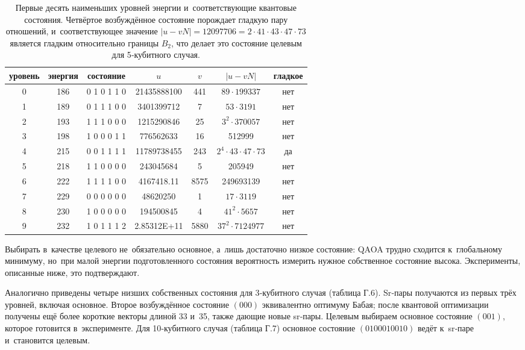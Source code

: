 \begin{table}[h]
    \centering
    \caption{
    Первые десять наименьших уровней энергии и соответствующие квантовые
    состояния. Четвёртое возбуждённое состояние порождает гладкую пару
    отношений, и соответствующее значение \( |u-vN| = 12097706 =
    2\cdot41\cdot43\cdot47\cdot73 \) является гладким относительно границы
    \(B_{2}\), что делает это состояние целевым для 5‑кубитного случая.
    }
\begin{tabular}{@{}ccccccc@{}}
\hline\hline
\textbf{уровень} & \textbf{энергия} & \textbf{состояние} &
\(u\) & \(v\) & \(|u-vN|\) & гладкое \\ \hline
0 & 186 & 0 1 0 1 1 0 & 21435888100 &   441 & $89{\cdot}199337$ & нет \\
1 & 189 & 0 1 1 1 0 0 &  3401399712 &    7 & $53{\cdot}3191$   & нет \\
2 & 193 & 1 1 1 0 0 0 & 1215290846 &   25 & $3^{2}{\cdot}370057$ & нет \\
3 & 198 & 1 0 0 0 1 1 &  776562633 &   16 &  512999           & нет \\
4 & 215 & 0 0 1 1 1 1 & 11789738455 & 243 & $2^{4}{\cdot}43{\cdot}47{\cdot}73$ & да \\
5 & 218 & 1 1 0 0 0 0 &  243045684  &    5 &  205949           & нет \\
6 & 222 & 1 1 1 1 0 0 & 4167418.11  & 8575 & 249693139         & нет \\
7 & 229 & 0 0 0 0 0 0 &   48620250 &    1 & $17{\cdot}3119$    & нет \\
8 & 230 & 1 0 0 0 0 0 & 194500845  &    4 & $41^{2}{\cdot}5657$ & нет \\
9 & 232 & 1 0 1 1 1 2 & 2.85312E+11 & 5880 & $37^{2}{\cdot}7124977$ & нет \\
\hline\hline
\end{tabular}
    \label{tab:tab7}
\end{table}

Выбирать в качестве целевого не обязательно основное, а~лишь достаточно низкое
состояние: QAOA трудно сходится к~глобальному минимуму, но при малой энергии
подготовленного состояния вероятность измерить нужное собственное состояние
высока. Эксперименты, описанные ниже, это подтверждают.

Аналогично приведены четыре низших собственных состояния для 3‑кубитного случая
(таблица Г.6). Sr‑пары получаются из первых трёх уровней, включая основное.
Второе возбуждённое состояние $(000)$ эквивалентно оптимуму Бабая; после
квантовой оптимизации получены ещё более короткие векторы длиной 33 и 35, также
дающие новые sr‑пары. Целевым выбираем основное состояние $(001)$, которое
готовится в эксперименте. Для 10‑кубитного случая (таблица Г.7) основное
состояние $(0100010010)$ ведёт к sr‑паре и становится целевым.

